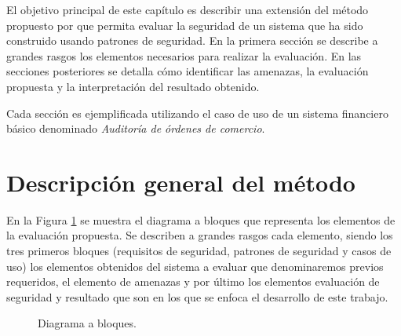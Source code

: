 El objetivo principal de este capítulo es describir una extensión del método propuesto por \cite{FerYosWas18} que permita evaluar la seguridad de un sistema que ha sido construido usando patrones de seguridad. En la primera sección se describe a grandes rasgos los elementos necesarios para realizar la evaluación. En las secciones posteriores se detalla cómo identificar las amenazas, la evaluación propuesta y la interpretación del resultado obtenido. 

\vspace{0.3cm}

Cada sección es ejemplificada utilizando el caso de uso de un sistema financiero básico denominado \textit{Auditoría de órdenes de comercio}.

\section{Descripción general del método}

En la Figura \ref{diagramabase} se muestra el diagrama a bloques que representa los elementos de la evaluación propuesta. Se describen a grandes rasgos cada elemento, siendo los tres primeros bloques (requisitos de seguridad, patrones de seguridad y casos de uso) los elementos obtenidos del sistema a evaluar que denominaremos previos requeridos, el elemento de amenazas y por último los elementos evaluación de seguridad y resultado que son en los que se enfoca el desarrollo de este trabajo. 

\begin{figure}[h!]
\centering
\caption{Diagrama a bloques.}
\label{diagramabase}
\end{figure}

